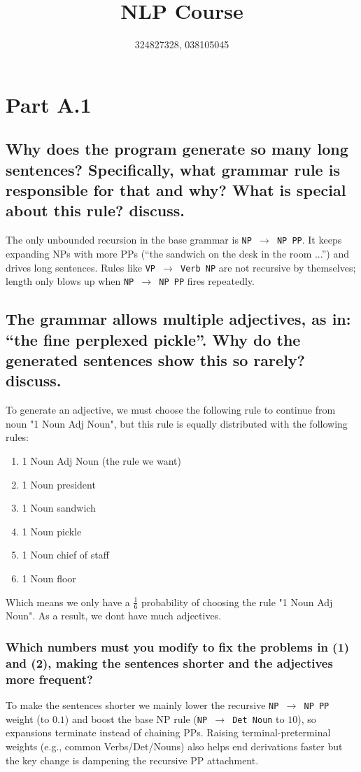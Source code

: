 \documentclass{article}
\title{NLP Course}
\author{324827328, 038105045}
\date{}
\begin{document}
\maketitle

\section*{Part A.1}
\subsection*{Why does the program generate so many long sentences? Specifically, what grammar rule is responsible for that and why? What is special about this rule? discuss.}

The only unbounded recursion in the base grammar is \texttt{NP $\to$ NP PP}. It keeps expanding NPs with more PPs (``the sandwich on the desk in the room ...'') and drives long sentences. Rules like \texttt{VP $\to$ Verb NP} are not recursive by themselves; length only blows up when \texttt{NP $\to$ NP PP} fires repeatedly.

\subsection*{The grammar allows multiple adjectives, as in: “the fine perplexed pickle”. Why do the generated sentences show this so rarely? discuss.}
To generate an adjective, we must choose the following rule to continue from noun "1	Noun	Adj Noun", but this rule is equally distributed with the following rules:
\begin{enumerate}
    \item 1	Noun	Adj Noun (the rule we want)
    \item 1	Noun	president
    \item 1	Noun	sandwich
    \item 1	Noun	pickle
    \item 1	Noun	chief of staff
    \item 1	Noun	floor
\end{enumerate}

Which means we only have a $\frac{1}{6}$ probability of choosing the rule "1	Noun	Adj Noun". As a result, we dont have much adjectives.

\subsubsection*{Which numbers must you modify to fix the problems in (1) and (2), making the sentences shorter and the adjectives more frequent?}
To make the sentences shorter we mainly lower the recursive \texttt{NP $\to$ NP PP} weight (to $0.1$) and boost the base NP rule (\texttt{NP $\to$ Det Noun} to $10$), so expansions terminate instead of chaining PPs. Raising terminal-preterminal weights (e.g., common Verbs/Det/Nouns) also helps end derivations faster but the key change is dampening the recursive PP attachment.
\end{document}
